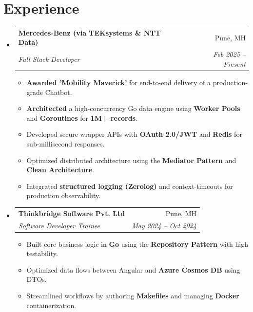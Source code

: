 \documentclass[letterpaper,11pt]{article}
\makeatletter
\newcommand{\resumeSubheading}[4]{
  \vspace{-1pt}\item
    \begin{tabular*}{0.97\textwidth}[t]{l@{\extracolsep{\fill}}r}
      \textbf{#1} & #2 \\
      \textit{\small#3} & \textit{\small #4} \\
    \end{tabular*}\vspace{-7pt}
}
\makeatother
\begin{document}
\section{Experience}
\begin{itemize}[leftmargin=0.15in, label={}]
    \resumeSubheading
      {Mercedes-Benz (via TEKsystems \& NTT Data)}{Pune, MH}
      {Full Stack Developer}{Feb 2025 -- Present}
      \begin{itemize}[nosep, leftmargin=1.5em]
        \item \small{\textbf{Awarded 'Mobility Maverick'} for end-to-end delivery of a production-grade Chatbot.}
        \item \small{\textbf{Architected} a high-concurrency Go data engine using \textbf{Worker Pools} and \textbf{Goroutines} for \textbf{1M+ records}.}
        \item \small{Developed secure wrapper APIs with \textbf{OAuth 2.0/JWT} and \textbf{Redis} for sub-millisecond responses.}
        \item \small{Optimized distributed architecture using the \textbf{Mediator Pattern} and \textbf{Clean Architecture}.}
        \item \small{Integrated \textbf{structured logging (Zerolog)} and context-timeouts for production observability.}
      \end{itemize}

    \resumeSubheading
      {Thinkbridge Software Pvt. Ltd}{Pune, MH}
      {Software Developer Trainee}{May 2024 -- Oct 2024}
      \begin{itemize}[nosep, leftmargin=1.5em]
        \item \small{Built core business logic in \textbf{Go} using the \textbf{Repository Pattern} with high testability.}
        \item \small{Optimized data flows between Angular and \textbf{Azure Cosmos DB} using DTOs.}
        \item \small{Streamlined workflows by authoring \textbf{Makefiles} and managing \textbf{Docker} containerization.}
      \end{itemize}
\end{itemize}

\end{document}
